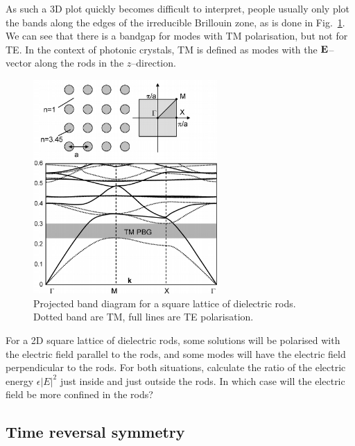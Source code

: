 As such a 3D plot quickly becomes difficult to interpret, people usually only plot the bands along the edges of the irreducible Brillouin zone, as is done in Fig.~\ref{fig-bands-rods}. We can see that there is a bandgap for modes with TM polarisation, but not for TE. In the context of photonic crystals, TM is defined as modes with the ${\bf E}$--vector along the rods in the $z$--direction.

\begin{figure}
\centering
\includegraphics[width=7cm]{periodic/figures/square_bands}
\caption{Projected band diagram for a square lattice of dielectric rods. Dotted band are TM, full lines are TE polarisation.}
\label{fig-bands-rods}
\end{figure}

\begin{sidebar}
\begin{ex}
For a 2D square lattice of dielectric rods, some solutions will be polarised with the electric field parallel to the rods, and some modes will have the electric field perpendicular to the rods. For both situations, calculate the ratio of the electric energy $\epsilon |E|^2$ just inside and just outside the rods. In which case will the electric field be more confined in the rods?
\end{ex}
\end{sidebar}
 

\subsection{Time reversal symmetry}

